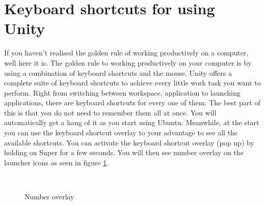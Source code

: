\section{Keyboard shortcuts for using Unity} 
If you haven't realised the golden rule of working productively on a computer, well here it is. The golden rule to working productively on your computer is by using a combination of keyboard shortcuts and the mouse. Unity offers a complete suite of keyboard shortcuts to achieve every little work task you want to perform. Right from switching between workspace, application to launching applications, there are keyboard shortcuts for every one of them. The best part of this is that you do not need to remember them all at once. You will automatically get a hang of it as you start using Ubuntu. Meanwhile, at the start you can use the keyboard shortcut overlay to your advantage to see all the available shortcuts. You can activate the keyboard shortcut overlay (pop up) by holding on Super for a few seconds. You will then see number overlay on the launcher icons as seen in figure \ref{fig:number-overlay}. \\

\begin{figure}[ht!]	
		\centering		
		~ \hspace{0.5in}
		~ \hspace{0.5in}
		~ \hspace{0.5in}
		\caption{Number overlay}
		\label{fig:number-overlay}
\end{figure}

